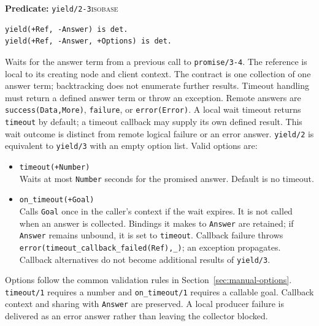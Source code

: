 \noindent \textbf{Predicate:} \texttt{yield/\allowbreak{}2-3}\hfill\textsc{isobase}

\begin{verbatim}
yield(+Ref, -Answer) is det.
yield(+Ref, -Answer, +Options) is det.
\end{verbatim}

\noindent Waits for the answer term from a previous call to
\texttt{promise/\allowbreak{}3-4}. The reference is local to its creating
node and client context. The contract is one collection of one answer term; backtracking
does not enumerate further results. Timeout handling must return a defined
answer term or throw an exception.
Remote answers are \texttt{success(\allowbreak{}Data,\allowbreak{}More)}, \texttt{failure}, or
\texttt{error(\allowbreak{}Error)}. A local wait timeout returns \texttt{timeout} by
default; a timeout callback may supply its own defined result. This wait
outcome is distinct from remote logical failure or an error answer.
\texttt{yield/\allowbreak{}2} is equivalent to \texttt{yield/\allowbreak{}3} with an empty option list.
Valid options
are:

\begin{itemize}
\item
  \texttt{timeout(\allowbreak{}+Number)}\\
  Waits at most \texttt{Number} seconds for the promised answer. Default is no
  timeout.
\item
  \texttt{on\_\allowbreak{}timeout(\allowbreak{}+Goal)}\\
  Calls \texttt{Goal} once in the caller's context if the wait expires.
  It is not called when an answer is collected.
  Bindings it makes to \texttt{Answer} are retained; if \texttt{Answer}
  remains unbound, it is set to \texttt{timeout}. Callback failure throws
  \texttt{error(\allowbreak{}timeout\_\allowbreak{}callback\_\allowbreak{}failed(\allowbreak{}Ref),\allowbreak{}\_\allowbreak{})}; an exception propagates.
  Callback alternatives do not become additional results of \texttt{yield/\allowbreak{}3}.
\end{itemize}

Options follow the common validation rules in Section~\ref{sec:manual-options}.
\texttt{timeout/\allowbreak{}1} requires a number and
\texttt{on\_\allowbreak{}timeout/\allowbreak{}1} requires a callable goal. Callback context and
sharing with \texttt{Answer} are preserved. A local producer failure is delivered as an error answer
rather than leaving the collector blocked.

